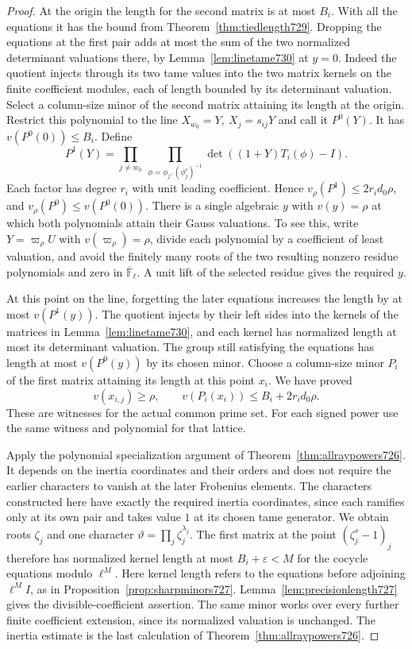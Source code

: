 \documentclass[a4paper,11pt]{article}
\theoremstyle{definition}
\theoremstyle{remark}
\numberwithin{equation}{section}
\begin{document}
\begin{proof}
At the origin the length for the second matrix is at most \(B_i\).
With all the equations it has the bound from
Theorem~\ref{thm:tiedlength729}. Dropping the equations at the first
pair adds at most the sum of the two normalized determinant valuations
there, by Lemma~\ref{lem:linetame730} at \(y=0\). Indeed the quotient
injects through its two tame values into the two matrix kernels on
the finite coefficient modules, each of length bounded by its
determinant valuation. Select a column-size minor of the second matrix
attaining its length at the origin. Restrict this polynomial to the
line \(X_{w_0}=Y,\ X_j=s_{ij}Y\) and call it \(P^0(Y)\).
It has \(v(P^0(0))\le B_i\). Define
\[
      P^1(Y)=\prod_{j\ne w_0}
             \ \prod_{\phi=\phi_j,(\phi_j^c)^{-1}}
                           \det((1+Y)T_i(\phi)-I).
\]
Each factor has degree \(r_i\) with unit leading coefficient. Hence
\(v_\rho(P^1)\le 2r_i d_0\rho\), and
\(v_\rho(P^0)\le v(P^0(0))\). There is a single algebraic \(y\)
with \(v(y)=\rho\) at which both polynomials attain their Gauss
valuations. To see this, write \(Y=\varpi_\rho U\) with
\(v(\varpi_\rho)=\rho\), divide each polynomial by a coefficient of
least valuation, and avoid the finitely many roots of the two resulting
nonzero residue polynomials and zero in
\(\overline{\mathbb F}_\ell\). A unit lift of the selected residue
gives the required \(y\).

At this point on the line, forgetting the later equations increases
the length by at most \(v(P^1(y))\). The quotient injects by their
left sides into the kernels of the matrices in
Lemma~\ref{lem:linetame730}, and each kernel has normalized length
at most its determinant valuation. The group still satisfying the
equations has length at most \(v(P^0(y))\) by its chosen minor.
Choose a column-size minor \(P_i\) of the first matrix attaining its
length at this point \(x_i\). We have proved
\[
         v(x_{i,j})\ge\rho,\qquad
         v(P_i(x_i))\le B_i+2r_i d_0\rho .
\]
These are witnesses for the actual common prime set. For each signed
power use the same witness and polynomial for that lattice.

Apply the polynomial specialization argument of
Theorem~\ref{thm:allraypowers726}. It depends on the inertia
coordinates and their orders and does not require the earlier
characters to vanish at the later Frobenius elements. The characters
constructed here have exactly the required inertia coordinates, since
each ramifies only at its own pair and takes value \(1\) at its
chosen tame generator. We obtain roots \(\zeta_j\) and one character
\(\vartheta=\prod_j\zeta_j^{\lambda_j}\). The first matrix at the
point \((\zeta_j^s-1)_j\) therefore has normalized kernel length at
most \(B_i+\varepsilon<M\) for the cocycle equations modulo \(\ell^M\).
Here kernel length refers to the equations before adjoining
\(\ell^M I\), as in Proposition~\ref{prop:sharpminors727}.
Lemma~\ref{lem:precisionlength727} gives the divisible-coefficient
assertion. The same minor works over every further finite coefficient
extension, since its normalized valuation is unchanged.
The inertia estimate is the last calculation of
Theorem~\ref{thm:allraypowers726}.
\end{proof}
\end{document}
